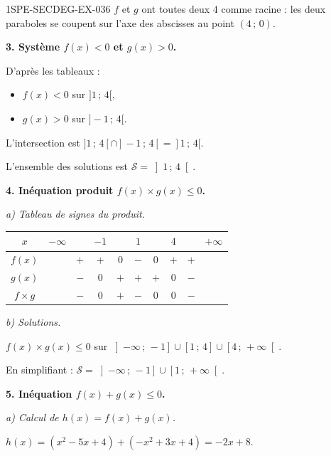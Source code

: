 \begin{corrige}{1SPE-SECDEG-EX-036}
$f$ et $g$ ont toutes deux $4$ comme racine : les deux paraboles se coupent sur l'axe des abscisses au point $(4\,;\,0)$.

\medskip
\textbf{3. Système $f(x) < 0$ et $g(x) > 0$.}


D'après les tableaux :
\begin{itemize}
  \item $f(x) < 0$ sur $]1\,;\,4[$,
  \item $g(x) > 0$ sur $]-1\,;\,4[$.
\end{itemize}

L'intersection est $]1\,;\,4[ \cap ]-1\,;\,4[ = ]1\,;\,4[$.

L'ensemble des solutions est $\mathcal{S} = \left]1\,;\,4\right[$.

\medskip
\textbf{4. Inéquation produit $f(x) \times g(x) \leqslant 0$.}

\textit{a) Tableau de signes du produit.}


\medskip
\begin{center}
\begin{tabular}{|c|ccccccccc|}
\hline
$x$ & $-\infty$ & & $-1$ & & $1$ & & $4$ & & $+\infty$ \\
\hline
$f(x)$ & & $+$ & $+$ & $0$ & $-$ & $0$ & $+$ & $+$ & \\
$g(x)$ & & $-$ & $0$ & $+$ & $+$ & $+$ & $0$ & $-$ & \\
\hline
$f \times g$ & & $-$ & $0$ & $+$ & $-$ & $0$ & $0$ & $-$ & \\
\hline
\end{tabular}
\end{center}

\textit{b) Solutions.}

$f(x) \times g(x) \leqslant 0$ sur $\left]-\infty\,;\,-1\right] \cup \left[1\,;\,4\right] \cup \left[4\,;\,+\infty\right[$.

En simplifiant : $\mathcal{S} = \left]-\infty\,;\,-1\right] \cup \left[1\,;\,+\infty\right[$.

\medskip
\textbf{5. Inéquation $f(x) + g(x) \leqslant 0$.}

\textit{a) Calcul de $h(x) = f(x) + g(x)$.}


$h(x) = (x^2 - 5x + 4) + (-x^2 + 3x + 4) = -2x + 8$.


\end{corrige}
